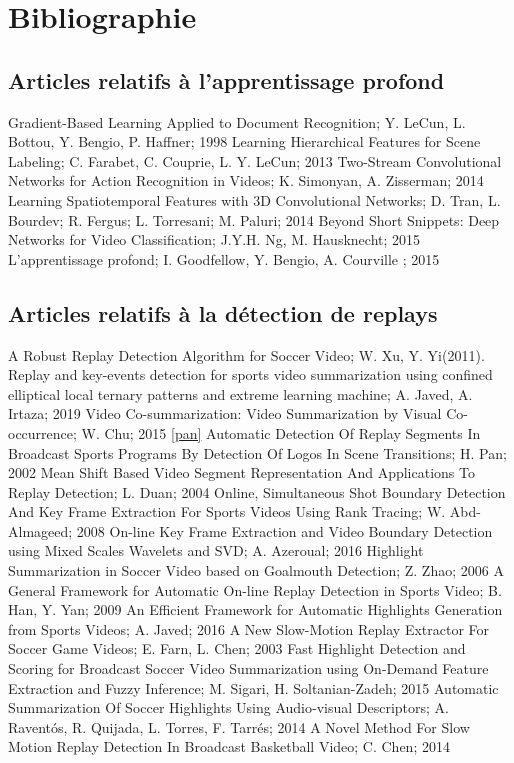 \documentclass[11pt]{article}
\begin{document}
\section{Bibliographie}
\label{sec:org534b7aa}
\subsection{Articles relatifs à l'apprentissage profond}
\label{sec:orgd7f1756}
Gradient-Based Learning Applied to Document Recognition; Y. LeCun, L. Bottou, Y. Bengio, P. Haffner; 1998
Learning Hierarchical Features for Scene Labeling; C. Farabet, C. Couprie, L. Y. LeCun; 2013
Two-Stream Convolutional Networks for Action Recognition in Videos; K. Simonyan, A. Zisserman; 2014
Learning Spatiotemporal Features with 3D Convolutional Networks; D. Tran, L. Bourdev; R. Fergus; L. Torresani; M. Paluri; 2014
Beyond Short Snippets: Deep Networks for Video Classification; J.Y.H. Ng, M. Hausknecht; 2015
L'apprentissage profond; I. Goodfellow, Y. Bengio, A. Courville ; 2015
\subsection{Articles relatifs à la détection de replays}
\label{sec:org03ba4d5}
A Robust Replay Detection Algorithm for Soccer Video; W. Xu, Y. Yi(2011).
Replay and key-events detection for sports video summarization using confined elliptical local ternary patterns and extreme learning machine; A. Javed, A. Irtaza; 2019
Video Co-summarization: Video Summarization by Visual Co-occurrence; W. Chu; 2015
\ref{pan} Automatic Detection Of Replay Segments In Broadcast Sports Programs By Detection Of Logos In Scene Transitions; H. Pan; 2002
Mean Shift Based Video Segment Representation And Applications To Replay Detection; L. Duan; 2004
Online, Simultaneous Shot Boundary Detection And Key Frame Extraction For Sports Videos Using Rank Tracing; W. Abd-Almageed; ‎2008
On-line Key Frame Extraction and Video Boundary Detection using Mixed Scales Wavelets and SVD; A. Azeroual; 2016
Highlight Summarization in Soccer Video based on Goalmouth Detection; Z. Zhao; 2006
A General Framework for Automatic On-line Replay Detection in Sports Video; B. Han, Y. Yan; 2009
An Efficient Framework for Automatic Highlights Generation from Sports Videos; A. Javed; 2016
A New Slow-Motion Replay Extractor For Soccer Game Videos; E. Farn, L. Chen; 2003
Fast Highlight Detection and Scoring for Broadcast Soccer Video Summarization using On-Demand Feature Extraction and Fuzzy Inference; M. Sigari, H. Soltanian-Zadeh;  2015
Automatic Summarization Of Soccer Highlights Using Audio‑visual Descriptors; A. Raventós, R. Quijada, L. Torres, F. Tarrés; 2014
A Novel Method For Slow Motion Replay Detection In Broadcast Basketball Video; C. Chen; 2014
\end{document}
